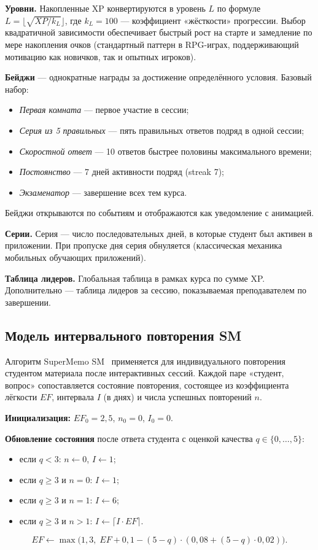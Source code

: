 \textbf{Уровни.} Накопленные XP конвертируются в уровень $L$
по формуле $L = \lfloor \sqrt{XP / k_L} \rfloor$, где $k_L = 100$ ---
коэффициент «жёсткости» прогрессии. Выбор квадратичной зависимости
обеспечивает быстрый рост на старте и замедление по мере накопления
очков (стандартный паттерн в RPG-играх, поддерживающий мотивацию
как новичков, так и опытных игроков).

\textbf{Бейджи} --- однократные награды за достижение определённого
условия. Базовый набор:
\begin{itemize}[noitemsep]
    \item \textit{Первая комната} --- первое участие в сессии;
    \item \textit{Серия из 5 правильных} --- пять правильных ответов
          подряд в одной сессии;
    \item \textit{Скоростной ответ} --- 10 ответов быстрее половины
          максимального времени;
    \item \textit{Постоянство} --- 7 дней активности подряд (streak 7);
    \item \textit{Экзаменатор} --- завершение всех тем курса.
\end{itemize}

Бейджи открываются по событиям и отображаются как уведомление
с анимацией.

\textbf{Серии.} Серия --- число последовательных дней, в которые
студент был активен в приложении. При пропуске дня серия
обнуляется (классическая механика мобильных обучающих приложений).

\textbf{Таблица лидеров.} Глобальная таблица в рамках курса
по сумме XP. Дополнительно --- таблица лидеров за сессию,
показываемая преподавателем по завершении.

\subsection{Модель интервального повторения SM}

Алгоритм SuperMemo SM~\cite{wozniak1990} применяется
для индивидуального повторения студентом материала после интерактивных
сессий. Каждой паре «студент, вопрос» сопоставляется состояние
повторения, состоящее из коэффициента лёгкости $EF$, интервала
$I$ (в днях) и числа успешных повторений $n$.

\textbf{Инициализация:} $EF_0 = 2{,}5$, $n_0 = 0$, $I_0 = 0$.

\textbf{Обновление состояния} после ответа студента с оценкой
качества $q \in \{0,\dots,5\}$:
\begin{itemize}[noitemsep]
    \item если $q < 3$: $n \leftarrow 0$, $I \leftarrow 1$;
    \item если $q \geq 3$ и $n = 0$: $I \leftarrow 1$;
    \item если $q \geq 3$ и $n = 1$: $I \leftarrow 6$;
    \item если $q \geq 3$ и $n > 1$: $I \leftarrow \lceil I \cdot EF \rceil$.
\end{itemize}
\[
    EF \leftarrow \max\bigl(1{,}3,\; EF + 0{,}1 - (5-q)\cdot(0{,}08 + (5-q)\cdot 0{,}02)\bigr).
\]

